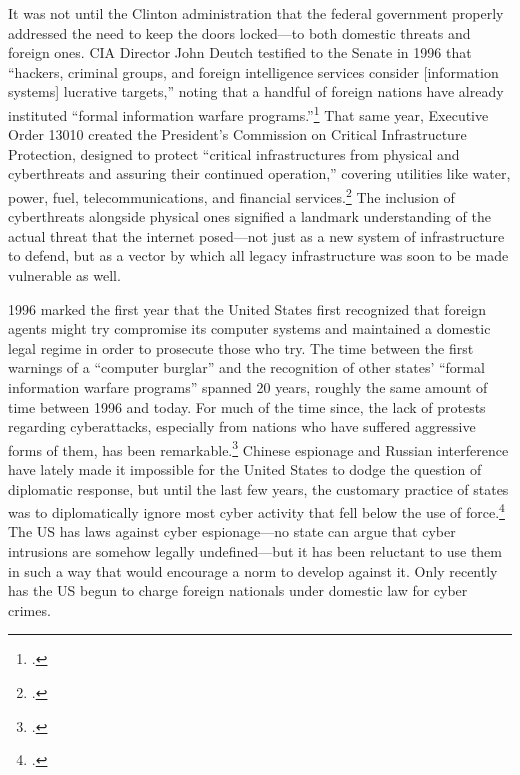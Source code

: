 \documentclass{memoir}
\begin{document}
\begin{refsegment}
It was not until the Clinton administration that the federal government properly addressed the need to keep the doors locked---to both domestic threats and foreign ones. CIA Director John Deutch testified to the Senate in 1996 that ``hackers, criminal groups, and foreign intelligence services consider [information systems] lucrative targets,'' noting that a handful of foreign nations have already instituted ``formal information warfare programs.''\footcite{deutch_worldwide_1996} That same year, Executive Order 13010 created the President's Commission on Critical Infrastructure Protection, designed to protect ``critical infrastructures from physical and cyberthreats and assuring their continued operation,'' covering utilities like water, power, fuel, telecommunications, and financial services.\footcite[~p.761]{boys_clinton_2018} The inclusion of cyberthreats alongside physical ones signified a landmark understanding of the actual threat that the internet posed---not just as a new system of infrastructure to defend, but as a vector by which all legacy infrastructure was soon to be made vulnerable as well.

1996 marked the first year that the United States first recognized that foreign agents might try compromise its computer systems and maintained a domestic legal regime in order to prosecute those who try. The time between the first warnings of a ``computer burglar'' and the recognition of other states' ``formal information warfare programs'' spanned 20 years, roughly the same amount of time between 1996 and today. For much of the time since, the lack of protests regarding cyberattacks, especially from nations who have suffered aggressive forms of them, has been remarkable.\footcite[p.~132]{brown_customary_2012} Chinese espionage and Russian interference have lately made it impossible for the United States to dodge the question of diplomatic response, but until the last few years, the customary practice of states was to diplomatically ignore most cyber activity that fell below the use of force.\footcite[p.~141]{brown_customary_2012} The US has laws against cyber espionage---no state can argue that cyber intrusions are somehow legally undefined---but it has been reluctant to use them in such a way that would encourage a norm to develop against it. Only recently has the US begun to charge foreign nationals under domestic law for cyber crimes.


\end{refsegment}
\end{document}
